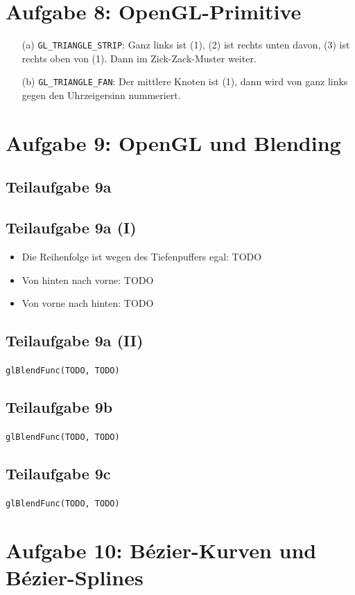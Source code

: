 \documentclass[a4paper]{scrartcl}
\begin{document}
\section*{Aufgabe 8: OpenGL-Primitive}
\begin{itemize}
    \item[(a)] \texttt{GL\_TRIANGLE\_STRIP}: Ganz links ist (1), (2) ist rechts unten davon, (3) ist rechts oben von (1). Dann im Zick-Zack-Muster weiter.
    \item[(b)] \texttt{GL\_TRIANGLE\_FAN}: Der mittlere Knoten ist (1), dann wird von ganz links gegen den Uhrzeigersinn nummeriert.
\end{itemize}

\section*{Aufgabe 9: OpenGL und Blending}
\subsection*{Teilaufgabe 9a}
\subsection*{Teilaufgabe 9a (I)}
\begin{itemize}
    \item Die Reihenfolge ist wegen des Tiefenpuffers egal: TODO
    \item Von hinten nach vorne: TODO
    \item Von vorne nach hinten: TODO
\end{itemize}

\subsection*{Teilaufgabe 9a (II)}
\texttt{glBlendFunc(TODO, TODO)}

\subsection*{Teilaufgabe 9b}
\texttt{glBlendFunc(TODO, TODO)}

\subsection*{Teilaufgabe 9c}
\texttt{glBlendFunc(TODO, TODO)}


\section*{Aufgabe 10: Bézier-Kurven und Bézier-Splines}
\end{document}
